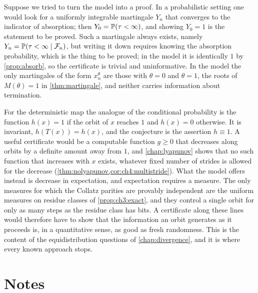 \begin{remark}\label{rem:ch3:cert}
Suppose we tried to turn the model into a proof. In a probabilistic setting
one would look for a uniformly integrable martingale $Y_n$ that converges to the
indicator of absorption; then $Y_0=\mathbb{P}(\tau<\infty)$, and showing $Y_0=1$ is
the statement to be proved. Such a martingale always exists, namely
$Y_n=\mathbb{P}(\tau<\infty\mid\mathcal{F}_n)$, but writing it down requires knowing the
absorption probability, which is the thing to be proved; in the model it is
identically $1$ by \cref{prop:absorb}, so the certificate is trivial and
uninformative. In the model the only martingales of the form $x_n^\theta$ are
those with $\theta=0$ and $\theta=1$, the roots of $M(\theta)=1$ in
\cref{thm:martingale}, and neither carries information about termination.

For the deterministic map the analogue of the conditional probability is the
function $h(x)=1$ if the orbit of $x$ reaches $1$ and $h(x)=0$ otherwise. It is
invariant, $h(T(x))=h(x)$, and the conjecture is the assertion $h\equiv1$. A
useful certificate would be a computable function $g\ge0$ that decreases along
orbits by a definite amount away from $1$, and \cref{chap:lyapunov} shows that
no such function that increases with $x$ exists, whatever fixed number of
strides is allowed for the decrease (\cref{thm:nolyapunov,cor:ch4:multistride}). What the model
offers instead is decrease in expectation, and expectation requires a measure.
The only measures for which the Collatz parities are provably independent are
the uniform measures on residue classes of \cref{prop:ch3:exact}, and they
control a single orbit for only as many steps as the residue class has bits. A
certificate along these lines would therefore have to show that the
information an orbit generates as it proceeds is, in a quantitative sense,
as good as fresh randomness. This is the content of the equidistribution
questions of \cref{chap:divergence}, and it is where every known approach
stops.
\end{remark}

\section*{Notes}

